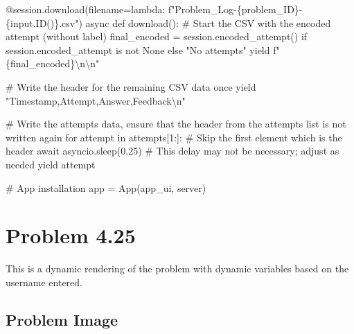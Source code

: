 \documentclass[
  letterpaper,
  DIV=11,
  numbers=noendperiod]{scrreprt}
\newenvironment{Shaded}{\begin{snugshade}}{\end{snugshade}}
\newcommand{\NormalTok}[1]{\textcolor[rgb]{0.00,0.23,0.31}{#1}}
\begin{document}
\begin{Shaded}
\begin{Highlighting}[]
\NormalTok{    @session.download(filename=lambda: f"Problem\_Log{-}\{problem\_ID\}{-}\{input.ID()\}.csv")}
\NormalTok{    async def download():}
\NormalTok{        \# Start the CSV with the encoded attempt (without label)}
\NormalTok{        final\_encoded = session.encoded\_attempt() if session.encoded\_attempt is not None else "No attempts"}
\NormalTok{        yield f"\{final\_encoded\}\textbackslash{}n\textbackslash{}n"}
        
\NormalTok{        \# Write the header for the remaining CSV data once}
\NormalTok{        yield "Timestamp,Attempt,Answer,Feedback\textbackslash{}n"}
        
\NormalTok{        \# Write the attempts data, ensure that the header from the attempts list is not written again}
\NormalTok{        for attempt in attempts[1:]:  \# Skip the first element which is the header}
\NormalTok{            await asyncio.sleep(0.25)  \# This delay may not be necessary; adjust as needed}
\NormalTok{            yield attempt}


\NormalTok{\# App installation}
\NormalTok{app = App(app\_ui, server)}
\end{Highlighting}
\end{Shaded}

\chapter*{Problem 4.25}\label{problem-4.25}


This is a dynamic rendering of the problem with dynamic variables based
on the username entered.

\section*{Problem Image}\label{problem-image-39}

\end{document}
